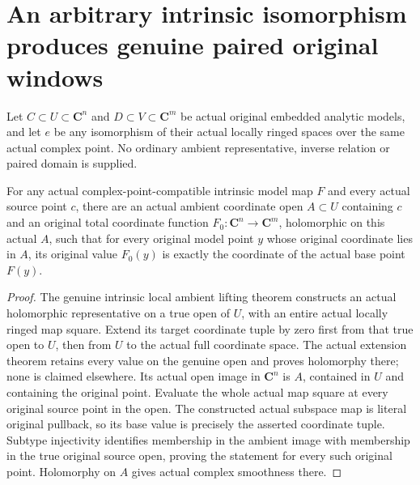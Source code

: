 \section{An arbitrary intrinsic isomorphism produces genuine paired original windows}

Let $C\subset U\subset\mathbf C^n$ and $D\subset V\subset\mathbf C^m$
be actual original embedded analytic models, and let $e$ be any isomorphism
of their actual locally ringed spaces over the same actual complex point.
No ordinary ambient representative, inverse relation or paired domain is
supplied.

\begin{theorem}
\label{hir:actual-intrinsic-iso-original-coordinate-window}
\leanok
For any actual complex-point-compatible intrinsic model map $F$ and every
actual source point $c$, there are an actual ambient coordinate open
$A\subset U$ containing $c$ and an original total coordinate function
$F_0:\mathbf C^n\to\mathbf C^m$, holomorphic on this actual $A$, such
that for every original model point $y$ whose original coordinate lies
in $A$, its original value $F_0(y)$ is exactly the coordinate of the
actual base point $F(y)$.
\end{theorem}
\begin{proof}
The genuine intrinsic local ambient lifting theorem constructs an actual
holomorphic representative on a true open of $U$, with an entire actual
locally ringed map square. Extend its target coordinate tuple by zero
first from that true open to $U$, then from $U$ to the actual full
coordinate space. The actual extension theorem retains every value on
the genuine open and proves holomorphy there; none is claimed elsewhere.
Its actual open image in $\mathbf C^n$ is $A$, contained in $U$ and
containing the original point. Evaluate the whole actual map square at
every original source point in the open. The constructed actual subspace
map is literal original pullback, so its base value is precisely the
asserted coordinate tuple. Subtype injectivity identifies membership in
the ambient image with membership in the true original source open,
proving the statement for every such original point. Holomorphy on $A$
gives actual complex smoothness there.
\end{proof}

